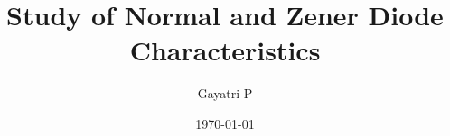 \documentclass[reprint,amsmath,amssymb,aps]{revtex4-2}
\begin{document}
    \title{Study of Normal and Zener Diode Characteristics}

    \author{Gayatri P}
    \date{\today}

    
    \maketitle

    
    
    
    

    
    
    \nocite{*}
\end{document}
